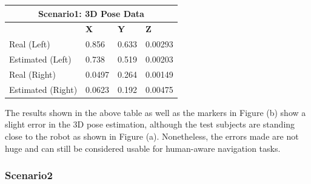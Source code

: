 \begin{table}[H]
  \centering
  \begin{tabular}{ |p{4cm}|p{2cm}|p{2cm}|p{2cm}|  }
    \hline
    \multicolumn{4}{|c|}{Scenario1: 3D Pose Data} \\
    \hline
    & \textbf{X} & \textbf{Y} & \textbf{Z} \\
    \hline
    Real (Left) & 0.856 & 0.633 & 0.00293 \\
    Estimated (Left) & 0.738 & 0.519 & 0.00203 \\
    \hline
    Real (Right) & 0.0497 & 0.264 & 0.00149 \\
    Estimated (Right) & 0.0623 & 0.192 & 0.00475 \\
    \hline
  \end{tabular}
  \label{Scenario1 3D poses.}
\end{table}

The results shown in the above table as well as the markers in Figure (b) show a slight error in the 3D pose estimation, although the test subjects are standing close to the robot as shown in Figure (a). Nonetheless, the errors made are not huge and can still be considered usable for human-aware navigation tasks.

\subsubsection{Scenario2}

